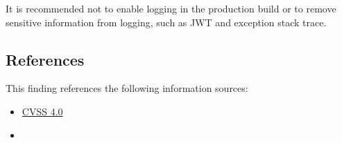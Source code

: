 It is recommended not to enable logging in the production build or to remove sensitive information from logging, such as JWT and exception stack trace.




\subsection*{References}

This finding references the following information sources:

\begin{itemize}
	\item \href{https://www.first.org/cvss/calculator/3.1#CVSS:3.1/AV:L/AC:L/PR:N/UI:N/S:U/C:L/I:N/A:N}{CVSS 4.0}
	\item {}
\end{itemize}





